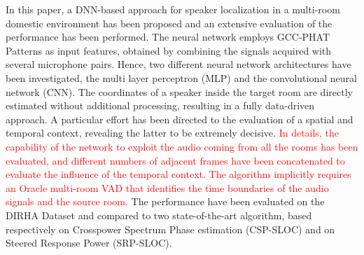\documentclass[review]{elsarticle}
\begin{document}
In this paper, a DNN-based approach for speaker localization in a multi-room domestic environment has been proposed and an extensive evaluation of the performance has been performed. The neural network employs GCC-PHAT Patterns as input features, obtained by combining the signals acquired with several microphone pairs. Hence, two different neural network architectures have been investigated, the multi layer perceptron (MLP) and the convolutional neural network (CNN). The coordinates of a speaker inside the target room are directly estimated without additional processing, resulting in a fully data-driven approach.
A particular effort has been directed to the evaluation of a spatial and temporal context, revealing the latter to be extremely decisive. \textcolor{red}{In details, the capability of the network to exploit the audio coming from all the rooms has been evaluated, and different numbers of adjacent frames have been concatenated to evaluate the influence of the temporal context.}
\textcolor{red}{The algorithm implicitly requires an Oracle multi-room VAD that identifies the time boundaries of the audio signals and the source room.} The performance have been evaluated on the DIRHA Dataset and compared to two state-of-the-art algorithm, based respectively on Crosspower Spectrum Phase estimation (CSP-SLOC) and on Steered Response Power (SRP-SLOC).
\end{document}
